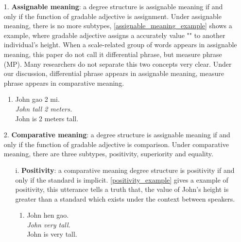 \documentclass{ctexart}
\begin{document}
\begin{itemize}

    \item[1.] \textbf{Assignable meaning}: a degree structure is assignable meaning if and only if the function of gradable adjective is assignment. Under assignable meaning, there is no more subtypes, \ref{assignable_meaning_example} shows a example, where gradable adjective assigns a accurately value "" to another individual's height. When a scale-related group of words appears in assignable meaning, this paper do not call it differential phrase, but measure phrase (MP). Many researchers do not separate this two concepts very clear. Under our discussion, differential phrase appears in assignable meaning, measure phrase appears in comparative meaning. 
    
    \begin{enumerate}
        \item \label{assignable_meaning_example}
        John gao 2 mi.\\
        \textit{John tall 2 meters.} \\
        John is 2 meters tall.
    \end{enumerate}
    
    \item[2.] \textbf{Comparative meaning}: a degree structure is assignable meaning if and only if the function of gradable adjective is comparison. Under comparative meaning, there are three subtypes, positivity, superiority and equality. 
    
    \begin{itemize}

        \item[i.] \textbf{Positivity}: a comparative meaning degree structure is positivity if and only if the standard is implicit. \ref{positivity_example} gives a example of positivity, this utterance tells a truth that, the value of John's height is greater than a standard which exists under the context between speakers. 
        
        \begin{enumerate}
            \item \label{positivity_example}
            John hen gao. \\
            \textit{John very tall.} \\
            John is very tall.
        \end{enumerate}
        

\end{itemize}
\end{itemize}
\end{document}

